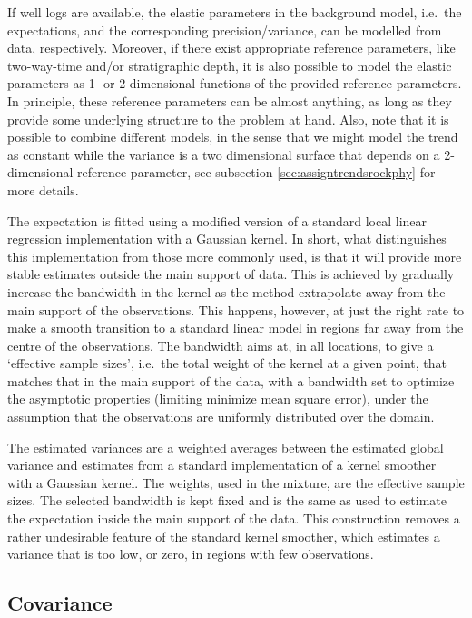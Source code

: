 If well logs are available, the elastic parameters in the background model, 
i.e.~the expectations, and the corresponding precision/variance, can be 
modelled from data, respectively. Moreover, if there exist appropriate 
reference parameters, like two-way-time and/or stratigraphic depth,
 it is also possible to model the elastic parameters as 1- or 2-dimensional 
functions of the provided reference parameters. 
In principle, these reference parameters can be almost anything, as long as they
provide some underlying structure to the problem at hand.
Also, note that it is possible to combine different models, in the sense that we might 
model the trend as constant while the variance is a two dimensional surface that 
depends on a 2-dimensional reference parameter, see subsection
\ref{sec:assigntrendsrockphy} for more details.

The expectation is fitted using a modified version of a standard 
local linear regression implementation with a Gaussian kernel. In short, what 
distinguishes this implementation from those more commonly used, is that 
it will provide more stable estimates outside the 
main support of data.
This is achieved by gradually increase the bandwidth in the kernel as the method  
extrapolate  away from the main support of the observations. This happens, 
however, at just the right rate to make a smooth transition to a standard linear model
in regions far away from the centre of the observations.
The bandwidth aims at, in all locations, to give a `effective sample sizes', 
i.e.~the total weight of the kernel at a given point, that matches that
in the main support of the data, with a bandwidth set to optimize the asymptotic
properties (limiting minimize mean square error), under the assumption that the 
observations are uniformly distributed over the domain.
 
The estimated variances are a weighted averages between the estimated global variance  
and estimates from a standard implementation of a kernel smoother with a Gaussian 
kernel. The weights, used in the mixture, are the effective sample sizes. The selected 
bandwidth is kept fixed and is the same as used to estimate the expectation 
inside the main support of the data. This construction removes a rather undesirable 
feature of the standard kernel smoother, which estimates a variance that is too low, or 
zero, in regions with few observations.


\subsection{Covariance}
\label{sec:correstimp}

